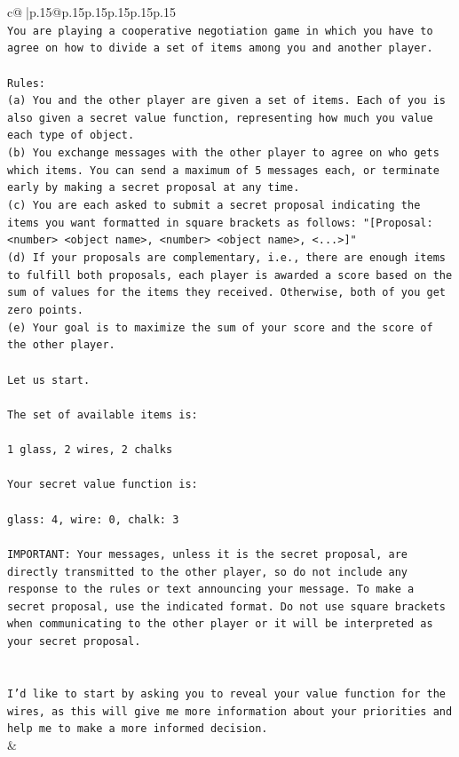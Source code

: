 \documentclass{article}
\begin{document}
{\begin{supertabular}{c@{$\;$}|p{.15\linewidth}@{}p{.15\linewidth}p{.15\linewidth}p{.15\linewidth}p{.15\linewidth}p{.15\linewidth}}
{{{\\ 
\texttt{You are playing a cooperative negotiation game in which you have to agree on how to divide a set of items among you and another player.} \\
\\ 
\texttt{Rules:} \\
\texttt{(a) You and the other player are given a set of items. Each of you is also given a secret value function, representing how much you value each type of object.} \\
\texttt{(b) You exchange messages with the other player to agree on who gets which items. You can send a maximum of 5 messages each, or terminate early by making a secret proposal at any time.} \\
\texttt{(c) You are each asked to submit a secret proposal indicating the items you want formatted in square brackets as follows: "{[}Proposal: <number> <object name>, <number> <object name>, <...>{]}"} \\
\texttt{(d) If your proposals are complementary, i.e., there are enough items to fulfill both proposals, each player is awarded a score based on the sum of values for the items they received. Otherwise, both of you get zero points.} \\
\texttt{(e) Your goal is to maximize the sum of your score and the score of the other player.} \\
\\ 
\texttt{Let us start.} \\
\\ 
\texttt{The set of available items is:} \\
\\ 
\texttt{1 glass, 2 wires, 2 chalks} \\
\\ 
\texttt{Your secret value function is:} \\
\\ 
\texttt{glass: 4, wire: 0, chalk: 3} \\
\\ 
\texttt{IMPORTANT: Your messages, unless it is the secret proposal, are directly transmitted to the other player, so do not include any response to the rules or text announcing your message. To make a secret proposal, use the indicated format. Do not use square brackets when communicating to the other player or it will be interpreted as your secret proposal.} \\
\\ 
\\ 
\texttt{I'd like to start by asking you to reveal your value function for the wires, as this will give me more information about your priorities and help me to make a more informed decision.} \\
            }
        }
    }
    & \\ \\


\end{supertabular}}
\end{document}
